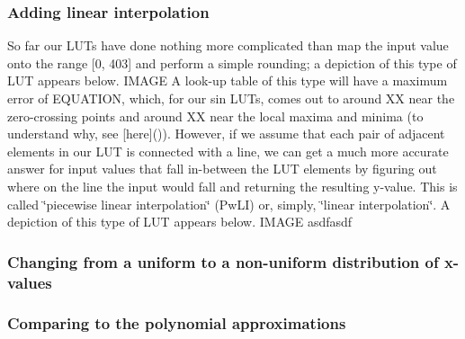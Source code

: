 \subsubsection*{Adding linear interpolation}

So far our L\+U\+Ts have done nothing more complicated than map the input value onto the range \mbox{[}0, 403\mbox{]} and perform a simple rounding; a depiction of this type of L\+UT appears below. I\+M\+A\+GE A look-\/up table of this type will have a maximum error of E\+Q\+U\+A\+T\+I\+ON, which, for our sin L\+U\+Ts, comes out to around XX near the zero-\/crossing points and around XX near the local maxima and minima (to understand why, see \mbox{[}here\mbox{]}()). However, if we assume that each pair of adjacent elements in our L\+UT is connected with a line, we can get a much more accurate answer for input values that fall in-\/between the L\+UT elements by figuring out where on the line the input would fall and returning the resulting y-\/value. This is called \char`\"{}piecewise linear interpolation\char`\"{} (Pw\+LI) or, simply, \char`\"{}linear interpolation\char`\"{}. A depiction of this type of L\+UT appears below. I\+M\+A\+GE asdfasdf

\subsubsection*{Changing from a uniform to a non-\/uniform distribution of x-\/values}

\subsubsection*{Comparing to the polynomial approximations}